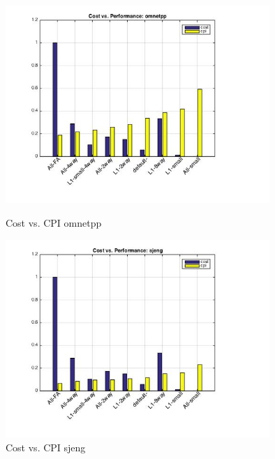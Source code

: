\documentclass[11pt,titlepage]{article}
\begin{document}
        \begin{figure}[H]
            \centering
            \begin{minipage}{.5\textwidth}
                \centering
                \includegraphics[width=10cm]{cvpomnetpp}
                \caption{Cost vs. CPI omnetpp}
                \label{fig:cvomnetpp}
            \end{minipage}%
            \begin{minipage}{.5\textwidth}
                \centering
                \includegraphics[width=10cm]{cvpsjeng}
                \caption{Cost vs. CPI sjeng}
                \label{fig:cvpsjeng}
            \end{minipage}
        \end{figure}
\end{document}
